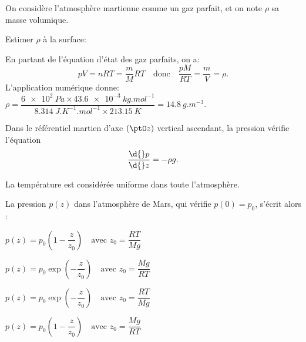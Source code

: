 

On considère l'atmosphère martienne comme un gaz parfait, et on note $\rho$  sa masse volumique.


\begin{enonce}
Estimer $\rho$ à la surface:
\end{enonce}


\begin{corrige}
En partant de l'équation d'état des gaz parfaits, on a: 
\[
pV=nRT=\frac{m}{M}RT\quad\text{donc}\quad\frac{pM}{RT}=\frac{m}{V}=\rho.
\]
L'application numérique donne: $\rho=\dfrac{\SI{6e2}{Pa}\times\SI{43.6e-3}{kg.mol^{-1}}}{\SI{8.314}{J.K^{-1}.mol^{-1}}\times\SI{213.15}{K}}=\SI{14.8}{g.m^{-3}}$.
\end{corrige}




Dans le référentiel martien d'axe $(\ptO z)$ vertical ascendant, la pression vérifie l'équation 
\[
\dfrac{\d{}p}{\d{}z}=-\rho g.
\]

La température est considérée uniforme dans toute l'atmosphère.



\begin{enonce}
La pression $p(z)$ dans l'atmosphère de Mars, qui vérifie $p(0) = p_0$, s'écrit alors :
\begin{listeQCM2Colonnes}
	\item $p(z) =p_0\left(1-\dfrac{z}{z_{0}}\right)\quad\text{avec }z_{0}=\dfrac{RT}{Mg}$
	\item $p(z)=p_0\exp\left(-\dfrac{z}{z_{0}}\right)\quad\text{avec }z_{0}=\dfrac{Mg}{RT}$
	\item $p(z)=p_0\exp\left(-\dfrac{z}{z_{0}}\right)\quad\text{avec }z_{0}=\dfrac{RT}{Mg}$
	\item $p(z)=p_0\left(1-\dfrac{z}{z_{0}}\right)\quad\text{avec }z_{0}=\dfrac{Mg}{RT}$
\end{listeQCM2Colonnes}
\bigskip
\end{enonce}

